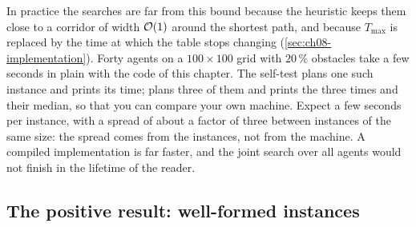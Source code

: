 In practice the searches are far from this bound because the heuristic keeps them
close to a corridor of width $\mathcal{O}\!\left(1\right)$ around the shortest path, and because
$T_{\max}$ is replaced by the time at which the table stops changing
(\cref{sec:ch08-implementation}). Forty agents on a $100 \times 100$ grid with
$20\,\%$ obstacles take a few seconds in plain \python with the code of this chapter.
The self-test plans one such instance and prints its time;  plans three of them and prints the three times and
their median, so that you can compare your own machine. Expect a few seconds per
instance, with a spread of about a factor of three between instances of the same size:
the spread comes from the instances, not from the machine. A compiled
implementation is far faster, and the joint search over all agents would not finish in
the lifetime of the reader.

\subsection{The positive result: well-formed instances}


